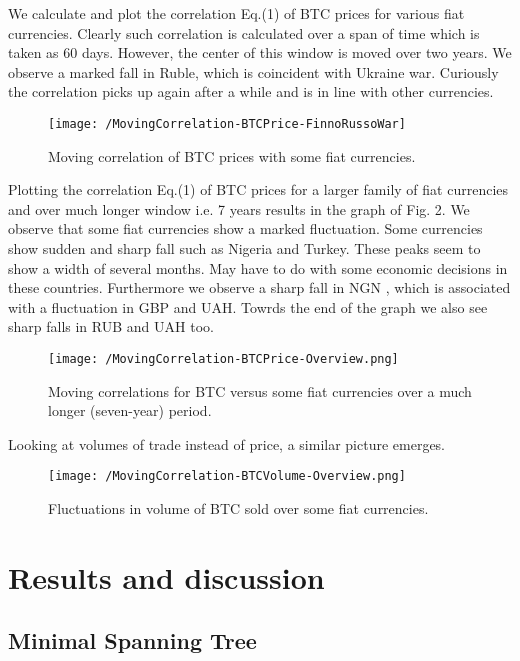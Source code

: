 \documentclass[fleqn,10pt]{SelfArx} %
\begin{document}
We calculate and plot the correlation Eq.(1)  of BTC prices for various fiat currencies. Clearly such correlation is calculated over a span of time which is taken as 60 days. However, the center of this window is moved over two years. We observe a marked fall in Ruble, which is coincident with Ukraine war. Curiously the correlation picks up again after a while and is in line with other currencies. 

\begin{figure}[!htb]
	\centering
	\texttt{[image: /MovingCorrelation-BTCPrice-FinnoRussoWar]}
	\label{fig.1}
	\caption{Moving correlation of BTC prices with some fiat currencies.}
\end{figure}

Plotting the correlation Eq.(1)  of BTC prices for a larger family of fiat currencies and over much longer window i.e. 7 years results in the graph of Fig. 2. We observe that some fiat currencies show a marked fluctuation. Some currencies show sudden and sharp fall such as Nigeria and Turkey. These peaks seem to show a width of several months. May have to do with some economic decisions in these countries.
Furthermore we observe a sharp fall in NGN , which is associated with a fluctuation in GBP and UAH. Towrds the end of the graph we also see sharp falls in RUB and UAH too.

\begin{figure}[!htb]
	\centering
	\texttt{[image: /MovingCorrelation-BTCPrice-Overview.png]}
	\label{fig.2}
	\caption{Moving correlations for BTC versus some fiat currencies over a much longer (seven-year) period.}
\end{figure}

Looking at volumes of trade instead of price, a similar picture emerges.

\begin{figure}[!htb]
	\centering
	\texttt{[image: /MovingCorrelation-BTCVolume-Overview.png]}
	\label{fig.3}
	\caption{Fluctuations in volume of BTC sold over some fiat currencies.}
\end{figure}

\section{Results and discussion}

\subsection{Minimal Spanning Tree}
\end{document}
